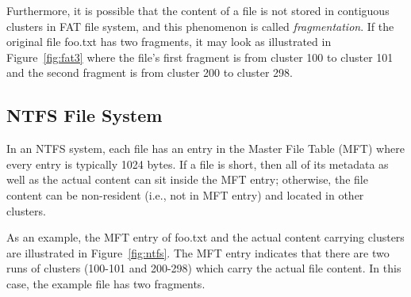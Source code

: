 \begin{paraphrase}

Furthermore, it is possible that the content of a file is not stored in contiguous clusters in FAT file system, 
and this phenomenon is called \emph{fragmentation}.
If the original file foo.txt has two fragments, it may look as illustrated in Figure~\ref{fig:fat3} where the file's first fragment is from cluster 100 to cluster 101 and the 
second fragment is from cluster 200 to cluster 298. 

\end{paraphrase}



\subsection{NTFS File System}
\begin{paraphrase}

In an NTFS system, each file has an entry in the Master File Table (MFT) where every entry is typically 1024 bytes. 
If a file is short, then all of its metadata as well as the actual content can sit inside the MFT entry; otherwise, 
the file content can be non-resident (i.e., not in MFT entry) and located in other clusters.
  
As an example, the MFT entry of foo.txt and the actual content carrying clusters are illustrated in Figure~\ref{fig:ntfs}.
The MFT entry indicates that there are two runs of clusters (100-101 and 200-298) which carry the actual file content. 
In this case, the example file has two fragments.

 
\end{paraphrase}

